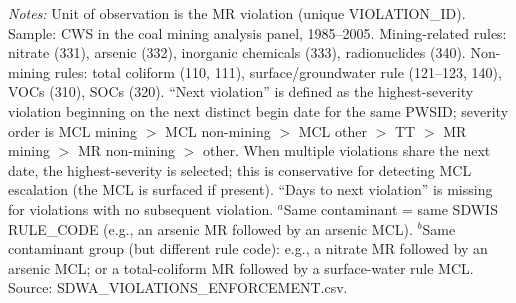 \begin{table}[htbp]
\begin{minipage}{\linewidth}
\vspace{4pt}
\footnotesize
\textit{Notes:} Unit of observation is the MR violation (unique VIOLATION\_ID). Sample: CWS in the coal mining analysis panel, 1985--2005. Mining-related rules: nitrate (331), arsenic (332), inorganic chemicals (333), radionuclides (340). Non-mining rules: total coliform (110, 111), surface/groundwater rule (121--123, 140), VOCs (310), SOCs (320). ``Next violation'' is defined as the highest-severity violation beginning on the next distinct begin date for the same PWSID; severity order is MCL mining $>$ MCL non-mining $>$ MCL other $>$ TT $>$ MR mining $>$ MR non-mining $>$ other. When multiple violations share the next date, the highest-severity is selected; this is conservative for detecting MCL escalation (the MCL is surfaced if present). ``Days to next violation'' is missing for violations with no subsequent violation. $^a$Same contaminant = same SDWIS RULE\_CODE (e.g., an arsenic MR followed by an arsenic MCL). $^b$Same contaminant group (but different rule code): e.g., a nitrate MR followed by an arsenic MCL; or a total-coliform MR followed by a surface-water rule MCL. Source: SDWA\_VIOLATIONS\_ENFORCEMENT.csv.
\end{minipage}
\end{table}
